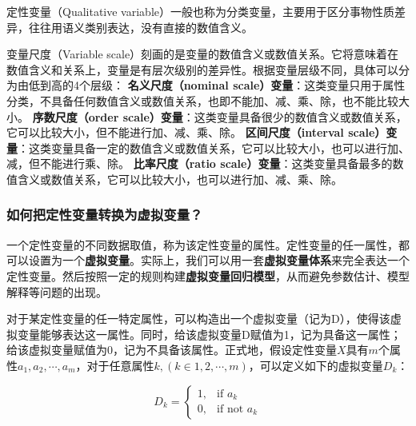\documentclass[12pt,(landscape,a4paper),(portrait,a4paper)]{article}
\theoremstyle{definition}
\theoremstyle{definition}
\theoremstyle{definition}
\theoremstyle{remark}
\let\BeginKnitrBlock\begin \let\EndKnitrBlock\end
\begin{document}
\BeginKnitrBlock{definition}[定性变量]
\protect\hypertarget{def:var-quality}{}{\label{def:var-quality}
{} }定性变量（Qualitative
variable）一般也称为分类变量，主要用于区分事物性质差异，往往用语义类别表达，没有直接的数值含义。
\EndKnitrBlock{definition}

\BeginKnitrBlock{definition}[变量尺度]
\protect\hypertarget{def:var-scale}{}{\label{def:var-scale}
{} }变量尺度（Variable
scale）刻画的是变量的数值含义或数值关系。它将意味着在数值含义和关系上，变量是有层次级别的差异性。根据变量层级不同，具体可以分为由低到高的4个层级：
\textbf{名义尺度（nominal
scale）变量}：这类变量只用于属性分类，不具备任何数值含义或数值关系，也即不能加、减、乘、除，也不能比较大小。
\textbf{序数尺度（order
scale）变量}：这类变量具备很少的数值含义或数值关系，它可以比较大小，但不能进行加、减、乘、除。
\textbf{区间尺度（interval
scale）变量}：这类变量具备一定的数值含义或数值关系，它可以比较大小，也可以进行加、减，但不能进行乘、除。
\textbf{比率尺度（ratio
scale）变量}：这类变量具备最多的数值含义或数值关系，它可以比较大小，也可以进行加、减、乘、除。
\EndKnitrBlock{definition}

\subsubsection{如何把定性变量转换为虚拟变量？}

一个定性变量的不同数据取值，称为该定性变量的属性。定性变量的任一属性，都可以设置为一个\textbf{虚拟变量}。实际上，我们可以用一套\textbf{虚拟变量体系}来完全表达一个定性变量。然后按照一定的规则构建\textbf{虚拟变量回归模型}，从而避免参数估计、模型解释等问题的出现。

\BeginKnitrBlock{definition}[虚拟变量]
\protect\hypertarget{def:var-dummy}{}{\label{def:var-dummy}
{}
}对于某定性变量的任一特定属性，可以构造出一个虚拟变量（记为D），使得该虚拟变量能够表达这一属性。同时，给该虚拟变量D赋值为1，记为具备这一属性；给该虚拟变量赋值为0，记为不具备该属性。正式地，假设定性变量\(X\)具有\(m\)个属性\(a_1,a_2,\cdots,a_m\)，对于任意属性\(k,(k\in{1,2,\cdots,m})\)，可以定义如下的虚拟变量\(D_k\)：

\begin{equation}
D_k=
\begin{cases}
1, & \text{if } a_k\\
0, & \text{if not }  a_k
\end{cases}
\end{equation}
\EndKnitrBlock{definition}
\end{document}
